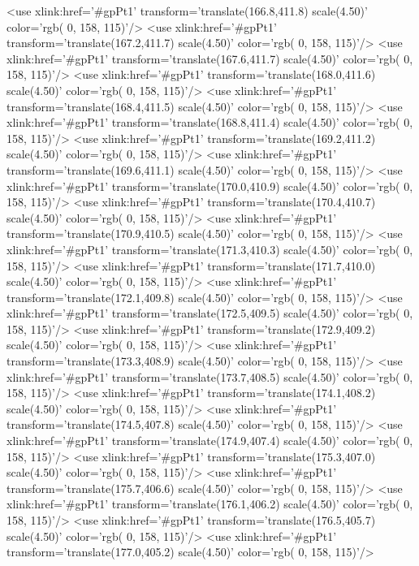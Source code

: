 	<use xlink:href='#gpPt1' transform='translate(166.8,411.8) scale(4.50)' color='rgb(  0, 158, 115)'/>
	<use xlink:href='#gpPt1' transform='translate(167.2,411.7) scale(4.50)' color='rgb(  0, 158, 115)'/>
	<use xlink:href='#gpPt1' transform='translate(167.6,411.7) scale(4.50)' color='rgb(  0, 158, 115)'/>
	<use xlink:href='#gpPt1' transform='translate(168.0,411.6) scale(4.50)' color='rgb(  0, 158, 115)'/>
	<use xlink:href='#gpPt1' transform='translate(168.4,411.5) scale(4.50)' color='rgb(  0, 158, 115)'/>
	<use xlink:href='#gpPt1' transform='translate(168.8,411.4) scale(4.50)' color='rgb(  0, 158, 115)'/>
	<use xlink:href='#gpPt1' transform='translate(169.2,411.2) scale(4.50)' color='rgb(  0, 158, 115)'/>
	<use xlink:href='#gpPt1' transform='translate(169.6,411.1) scale(4.50)' color='rgb(  0, 158, 115)'/>
	<use xlink:href='#gpPt1' transform='translate(170.0,410.9) scale(4.50)' color='rgb(  0, 158, 115)'/>
	<use xlink:href='#gpPt1' transform='translate(170.4,410.7) scale(4.50)' color='rgb(  0, 158, 115)'/>
	<use xlink:href='#gpPt1' transform='translate(170.9,410.5) scale(4.50)' color='rgb(  0, 158, 115)'/>
	<use xlink:href='#gpPt1' transform='translate(171.3,410.3) scale(4.50)' color='rgb(  0, 158, 115)'/>
	<use xlink:href='#gpPt1' transform='translate(171.7,410.0) scale(4.50)' color='rgb(  0, 158, 115)'/>
	<use xlink:href='#gpPt1' transform='translate(172.1,409.8) scale(4.50)' color='rgb(  0, 158, 115)'/>
	<use xlink:href='#gpPt1' transform='translate(172.5,409.5) scale(4.50)' color='rgb(  0, 158, 115)'/>
	<use xlink:href='#gpPt1' transform='translate(172.9,409.2) scale(4.50)' color='rgb(  0, 158, 115)'/>
	<use xlink:href='#gpPt1' transform='translate(173.3,408.9) scale(4.50)' color='rgb(  0, 158, 115)'/>
	<use xlink:href='#gpPt1' transform='translate(173.7,408.5) scale(4.50)' color='rgb(  0, 158, 115)'/>
	<use xlink:href='#gpPt1' transform='translate(174.1,408.2) scale(4.50)' color='rgb(  0, 158, 115)'/>
	<use xlink:href='#gpPt1' transform='translate(174.5,407.8) scale(4.50)' color='rgb(  0, 158, 115)'/>
	<use xlink:href='#gpPt1' transform='translate(174.9,407.4) scale(4.50)' color='rgb(  0, 158, 115)'/>
	<use xlink:href='#gpPt1' transform='translate(175.3,407.0) scale(4.50)' color='rgb(  0, 158, 115)'/>
	<use xlink:href='#gpPt1' transform='translate(175.7,406.6) scale(4.50)' color='rgb(  0, 158, 115)'/>
	<use xlink:href='#gpPt1' transform='translate(176.1,406.2) scale(4.50)' color='rgb(  0, 158, 115)'/>
	<use xlink:href='#gpPt1' transform='translate(176.5,405.7) scale(4.50)' color='rgb(  0, 158, 115)'/>
	<use xlink:href='#gpPt1' transform='translate(177.0,405.2) scale(4.50)' color='rgb(  0, 158, 115)'/>
